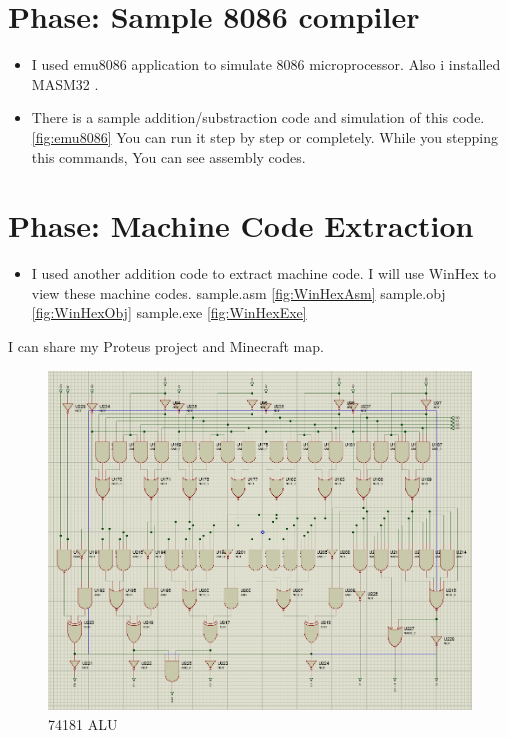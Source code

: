 \documentclass[11pt]{article}
\begin{document}
\newpage

\section{Phase: Sample 8086 compiler}

\begin{itemize}
	\item {I used emu8086 application to simulate 8086 microprocessor. Also i installed MASM32 .}
	\item {There is a sample addition/substraction code and simulation of this code. \ref{fig:emu8086} }
	\newline You can run it step by step or completely. While you stepping this commands, You can see assembly codes.
\end{itemize}

\section{Phase: Machine Code Extraction}

\begin{itemize}
	\item {I used another addition code to extract machine code. I will use WinHex to view these machine codes. }
	\newline sample.asm \ref{fig:WinHexAsm}
	\newline sample.obj \ref{fig:WinHexObj}
	\newline sample.exe \ref{fig:WinHexExe}
\end{itemize}

I can share my Proteus project and Minecraft map.

\begin{figure}[h!]
        \centering
        \includegraphics[width=17cm]{74181.png}
        \caption{74181 ALU}
        \label{fig:74181}
\end{figure}
\end{document}

